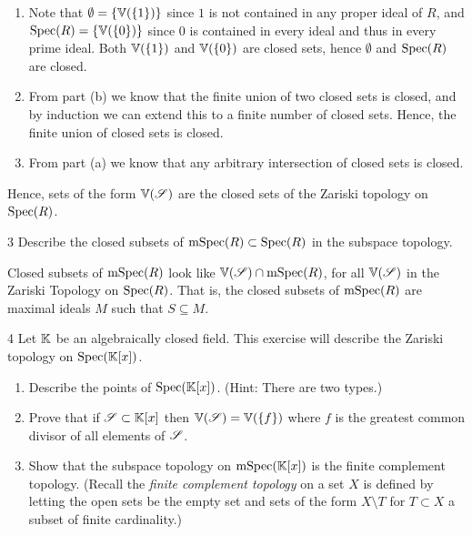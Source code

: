 \documentclass[Notebook.tex]{subfiles}
\begin{document}
\begin{solution}
\begin{enumerate} [label=(\alph*),ref=\theenumi\alph*]
        \begin{enumerate}
            \item [(i)] Note that $\emptyset = \{\mathbb V(\{1\})\}$ since $1$ is not contained in any proper ideal of $R$, and $\operatorname{Spec}(R) = \{\mathbb V(\{0\})\}$ since $0$ is contained in every ideal and thus in every prime ideal. Both $\mathbb V(\{1\})$ and $\mathbb V(\{0\})$ are closed sets, hence $\emptyset$ and $\operatorname{Spec}(R)$ are closed. 
            \item [(ii)] From part (b) we know that the finite union of two closed sets is closed, and by induction we can extend this to a finite number of closed sets. Hence, the finite union of closed sets is closed. 
            \item [(iii)] From part (a) we know that any arbitrary intersection of closed sets is closed. 
        \end{enumerate}
        Hence, sets of the form $\mathbb V(\operatorname{\mathscr S})$ are the closed sets of the Zariski topology on $\operatorname{Spec}(R)$.
    \end{enumerate}    
\end{solution}


\vspace{.2in}


\begin{problem}{3}
    Describe the closed subsets of $\operatorname{mSpec}(R) \subset \operatorname{Spec}(R)$ in the subspace topology.
\end{problem}

\begin{solution}
    \bbni

    Closed subsets of $\operatorname{mSpec}(R)$ look like $\mathbb V(\operatorname{\mathscr S}) \cap \operatorname{mSpec}(R)$, for all $\mathbb V(\operatorname{\mathscr S})$ in the Zariski Topology on $\operatorname{Spec}(R)$. That is, the closed subsets of $\operatorname{mSpec}(R)$ are maximal ideals $M$ such that $S \subseteq M$. 
\end{solution}

\newpage 

\begin{problem}{4}
    Let $\mathbb K$ be an algebraically closed field. This exercise will describe the Zariski topology on $\operatorname{Spec}(\mathbb K[x])$. 
    \begin{enumerate}[label=(\alph*),ref=\theenumi\alph*]
        \item Describe the points of $\operatorname{Spec}(\mathbb K[x])$. (Hint: There are two types.)
        \item Prove that if $\operatorname{\mathscr S} \subset \mathbb K[x]$ then $\mathbb V(\operatorname{\mathscr S}) = \mathbb V(\{f\})$ where $f$ is the greatest common divisor of all elements of $\operatorname{\mathscr S}$. 
        \item Show that the subspace topology on $\operatorname{mSpec}(\mathbb K[x])$ is the finite complement topology. (Recall the \emph{finite complement topology} on a set $X$ is defined by letting the open sets be the empty set and sets of the form $X \setminus T$ for $T \subset X$ a subset of finite cardinality.)
    \end{enumerate}
\end{problem}
\end{document}
